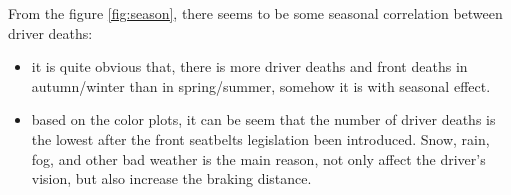 \documentclass[11pt,a4paper,]{article}
\begin{document}
From the figure \ref{fig:season}, there seems to be some seasonal correlation between driver deaths:

\begin{itemize}
\item
  it is quite obvious that, there is more driver deaths and front deaths in autumn/winter than in spring/summer, somehow it is with seasonal effect.
\item
  based on the color plots, it can be seem that the number of driver deaths is the lowest after the front seatbelts legislation been introduced. Snow, rain, fog, and other bad weather is the main reason, not only affect the driver's vision, but also increase the braking distance.
\end{itemize}

\printbibliography
\end{document}
